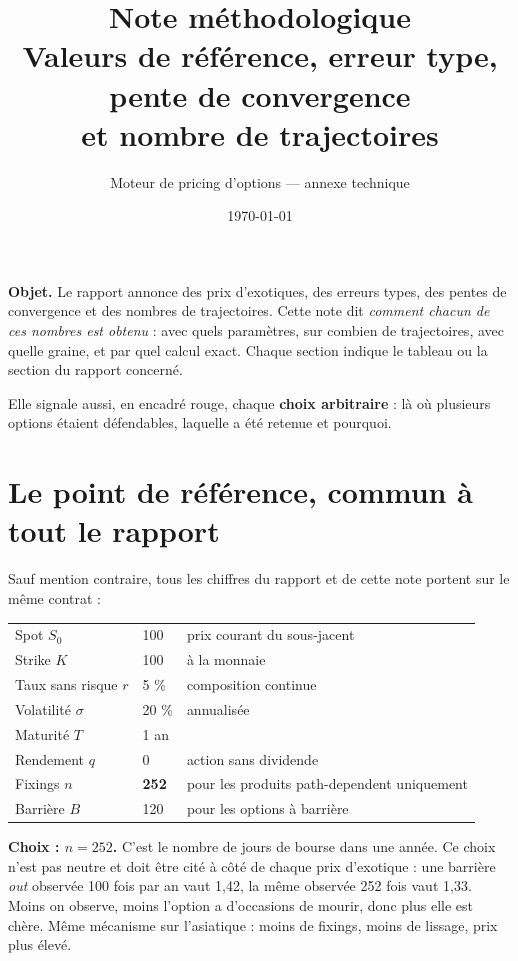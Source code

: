 \documentclass[11pt,a4paper]{article}
\title{\vspace{-1.6cm}\bfseries Note méthodologique\\
\large Valeurs de référence, erreur type, pente de convergence\\
et nombre de trajectoires}
\author{\normalsize Moteur de pricing d'options --- annexe technique}
\date{\normalsize\today}
\begin{document}
\maketitle
\vspace{-0.7cm}

\begin{encadre}
\textbf{Objet.} Le rapport annonce des prix d'exotiques, des erreurs types, des
pentes de convergence et des nombres de trajectoires. Cette note dit
\emph{comment chacun de ces nombres est obtenu} : avec quels paramètres, sur
combien de trajectoires, avec quelle graine, et par quel calcul exact. Chaque
section indique le tableau ou la section du rapport concerné.

Elle signale aussi, en encadré rouge, chaque \textbf{choix arbitraire} :
là où plusieurs options étaient défendables, laquelle a été retenue et pourquoi.
\end{encadre}

\section{Le point de référence, commun à tout le rapport}

Sauf mention contraire, tous les chiffres du rapport et de cette note portent
sur le même contrat :

\begin{center}
\small
\begin{tabular}{lll}
\toprule
Spot $S_0$ & 100 & prix courant du sous-jacent \\
Strike $K$ & 100 & à la monnaie \\
Taux sans risque $r$ & 5 \% & composition continue \\
Volatilité $\sigma$ & 20 \% & annualisée \\
Maturité $T$ & 1 an & \\
Rendement $q$ & 0 & action sans dividende \\
Fixings $n$ & \textbf{252} & pour les produits path-dependent uniquement \\
Barrière $B$ & 120 & pour les options à barrière \\
\bottomrule
\end{tabular}
\end{center}

\begin{choix}
\textbf{Choix : $n = 252$.} C'est le nombre de jours de bourse dans une année.
Ce choix n'est pas neutre et doit être cité à côté de chaque prix
d'exotique : une barrière \emph{out} observée 100 fois par an vaut 1,42, la
même observée 252 fois vaut 1,33. Moins on observe, moins l'option a
d'occasions de mourir, donc plus elle est chère. Même mécanisme sur
l'asiatique : moins de fixings, moins de lissage, prix plus élevé.
\end{choix}
\end{document}
